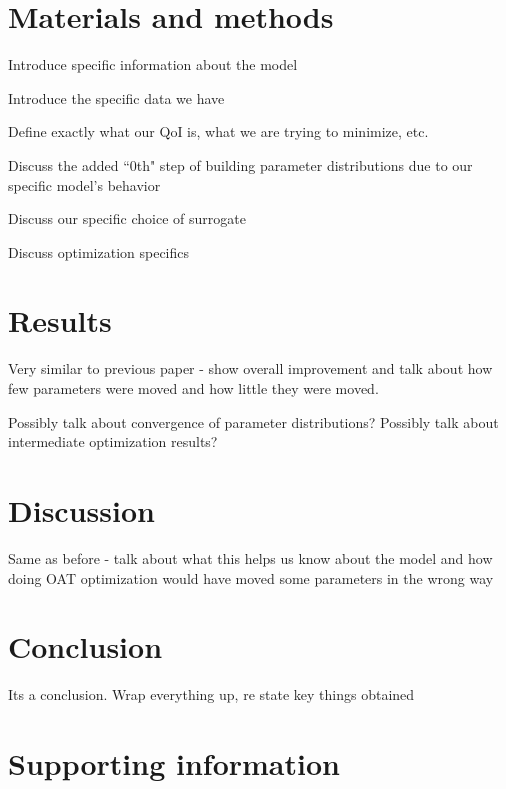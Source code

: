 \documentclass[10pt,letterpaper]{article}
\begin{document}
	\section*{Materials and methods}
	
	Introduce specific information about the model
	
	Introduce the specific data we have
	
	Define exactly what our QoI is, what we are trying to minimize, etc. 
	
	Discuss the added ``0th" step of building parameter distributions due to our specific model's behavior
	
	Discuss our specific choice of surrogate
	
	Discuss optimization specifics 
	
	
	
	
	\section*{Results}
	
	
	Very similar to previous paper - show overall improvement and talk about how few parameters were moved and how little they were moved.
	
	Possibly talk about convergence of parameter distributions? Possibly talk about intermediate optimization results?
	
	
	\section*{Discussion}
	
	Same as before - talk about what this helps us know about the model and how doing OAT optimization would have moved some parameters in the wrong way
	
	
	\section*{Conclusion}
	
	Its a conclusion. Wrap everything up, re state key things obtained
	
	
	\section*{Supporting information}
	
\end{document}
